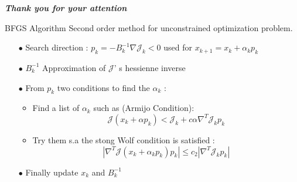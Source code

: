 \documentclass[10pt,
			   xcolor=svgnames,
			   hyperref={linkcolor=red, citecolor = DarkGreen, colorlinks=true, urlcolor=Navy}]{beamer}
\newcommand{\bepar}[1]{
	\left( #1 \right)  
}
\newcommand{\norm}[1]{
	\left \vert \left \vert #1 \right \vert  \right \vert
}
\newcommand{\bwarrow}{\item[\color{DarkRed} \ding{227}]}
\newcommand\bk{\color{black}}
\begin{document}
\begin{frame}
\begin{center}
	\color{FireBrick} \textbf{\textit{\Large{Thank you for your attention}}} \bk
\end{center}
\end{frame}

\appendix

\begin{frame}{BFGS Algorithm}
	Second order method for unconstrained optimization problem.
	\begin{itemize}
		\item[$\bullet$] Search direction : $p_k = -B_k^{-1}\nabla \mathcal{J}_k < 0$ used for $x_{k+1} = x_k + \alpha_k p_k$   \\[3mm]
		\item[$\bullet$] $B_k^{-1}$  Approximation of $\mathcal{J}$' s hessienne inverse \\[3mm]
		\item[$\bullet$] From $p_k$ two conditions to find the $\alpha_k$ : \\[2mm]
		\begin{itemize}
			\bwarrow Find a list of $\alpha_k$ such as (Armijo Condition):$$ \mathcal{J}\bepar{x_k + \alpha p_k} < \mathcal{J}_k + c\alpha \nabla^T\mathcal{J}_k p_k$$ 	
			\bwarrow Try them s.a the stong Wolf condition is satisfied :
			$$|\nabla^T \mathcal{J} \bepar{x_k + \alpha_k p_k} p_k| \leq c_2 |\nabla^T \mathcal{J}_kp_k|$$
		\end{itemize}
		\item[$\bullet$] Finally update $x_k$ and $B^{-1}_k$
	\end{itemize}
\end{frame}
\end{document}
